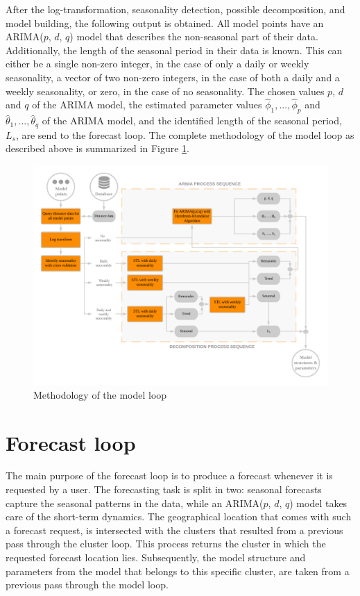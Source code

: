 \documentclass[12pt,oneside]{reedthesis}
\begin{document}
After the log-transformation, seasonality detection, possible
decomposition, and model building, the following output is obtained. All
model points have an ARIMA(\(p\), \(d\), \(q\)) model that describes the
non-seasonal part of their data. Additionally, the length of the
seasonal period in their data is known. This can either be a single
non-zero integer, in the case of only a daily or weekly seasonality, a
vector of two non-zero integers, in the case of both a daily and a
weekly seasonality, or zero, in the case of no seasonality. The chosen
values \(p\), \(d\) and \(q\) of the ARIMA model, the estimated
parameter values \(\hat\phi_{1},...,\hat\phi_{p}\) and
\(\hat\theta_{1},...,\hat\theta_{q}\) of the ARIMA model, and the
identified length of the seasonal period, \(L_{s}\), are send to the
forecast loop. The complete methodology of the model loop as described
above is summarized in Figure \ref{fig:modelloop}.
\begin{figure}[H]
\includegraphics[width=\textwidth]{Figures/Modelloop} \caption{Methodology of the model loop}\label{fig:modelloop}
\end{figure}
\section{Forecast loop}\label{threeeight}

The main purpose of the forecast loop is to produce a forecast whenever
it is requested by a user. The forecasting task is split in two:
seasonal forecasts capture the seasonal patterns in the data, while an
ARIMA(\(p\), \(d\), \(q\)) model takes care of the short-term dynamics.
The geographical location that comes with such a forecast request, is
intersected with the clusters that resulted from a previous pass through
the cluster loop. This process returns the cluster in which the
requested forecast location lies. Subsequently, the model structure and
parameters from the model that belongs to this specific cluster, are
taken from a previous pass through the model loop.
\end{document}
